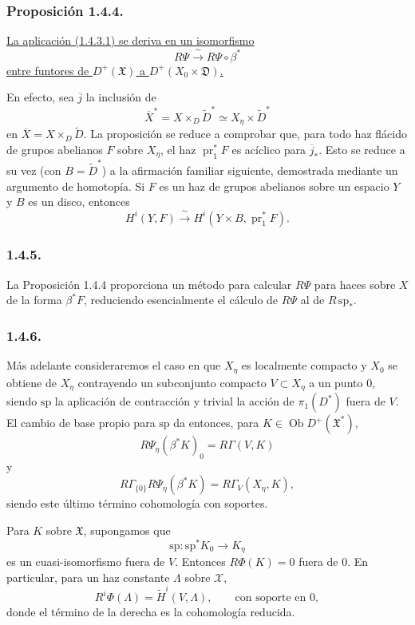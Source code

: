 \subsubsection*{Proposición 1.4.4.}
\underline{La aplicación (1.4.3.1) se deriva en un isomorfismo}
\[
R\Psi\xrightarrow{\ \sim\ }R\Psi\circ\beta^*
\]
\underline{entre funtores de $D^+(\mathfrak X)$ a
$D^+(X_0\times\mathfrak D)$.}

\pageoriginale

En efecto, sea $\overline j$ la inclusión de
\[
\overline X^*=X\times_D\widetilde D^*
\simeq X_\eta\times\widetilde D^*
\]
en $\overline X=X\times_D\widetilde D$. La proposición se reduce a comprobar
que, para todo haz flácido de grupos abelianos $F$ sobre $X_\eta$, el haz
$\operatorname{pr}_1^*F$ es acíclico para $\overline j_*$. Esto se reduce a su
vez (con $B=\widetilde D^*$) a la afirmación familiar siguiente, demostrada
mediante un argumento de homotopía. Si $F$ es un haz de grupos abelianos sobre
un espacio $Y$ y $B$ es un disco, entonces
\[
H^i(Y,F)\xrightarrow{\ \sim\ }
H^i(Y\times B,\operatorname{pr}_1^*F).
\]

\subsubsection*{1.4.5.}
La Proposición 1.4.4 proporciona un método para calcular $R\Psi$ para haces
sobre $X$ de la forma $\beta^*F$, reduciendo esencialmente el cálculo de
$R\Psi$ al de $R\,\mathrm{sp}_*$.

\subsubsection*{1.4.6.}
Más adelante consideraremos el caso en que $X_\eta$ es localmente compacto y
$X_0$ se obtiene de $X_\eta$ contrayendo un subconjunto compacto
$V\subset X_\eta$ a un punto $0$, siendo $\mathrm{sp}$ la aplicación de
contracción y trivial la acción de $\pi_1(D^*)$ fuera de $V$. El cambio de
base propio para $\mathrm{sp}$ da entonces, para
$K\in\operatorname{Ob}D^+(\mathfrak X^*)$,
\begin{equation}\tag{1.4.6.1}
R\Psi_\eta(\beta^*K)_0=R\Gamma(V,K)
\end{equation}
y
\begin{equation}\tag{1.4.6.2}
R\Gamma_{\{0\}}R\Psi_\eta(\beta^*K)
=R\Gamma_V(X_\eta,K),
\end{equation}
siendo este último término cohomología con soportes.

Para $K$ sobre $\mathfrak X$, supongamos que
\[
\mathrm{sp}:\mathrm{sp}^*K_0\longrightarrow K_\eta
\]
es un cuasi-isomorfismo fuera de $V$. Entonces $R\Phi(K)=0$ fuera de $0$. En
particular, para un haz constante $\Lambda$ sobre $\mathcal X$,
\[
R^i\Phi(\Lambda)=\widetilde H^i(V,\Lambda),
\qquad\text{con soporte en }0,
\]
donde el término de la derecha es la cohomología reducida.

